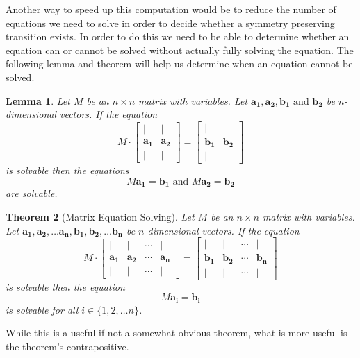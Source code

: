 \documentclass[a4paper,10pt]{article}
\theoremstyle{plain}
\newtheorem{Theorem}{Theorem}
\newtheorem{Lemma}[Theorem]{Lemma}
\theoremstyle{definition}
\theoremstyle{remark}
\renewcommand{\vec}[1]{\mathbf{#1}}
\begin{document}
Another way to speed up this computation would be to reduce the number of equations we need to solve in order to decide whether a symmetry preserving transition exists.
In order to do this we need to be able to determine whether an equation can or cannot be solved without actually fully solving the equation.
The following lemma and theorem will help us determine when an equation cannot be solved.
\begin{Lemma}
	Let \( M \) be an \( n \times n \) matrix with variables.
	Let \( \vec{a_1}, \vec{a_2}, \vec{b_1} \text{ and } \vec{b_2} \) be \( n \)-dimensional vectors.
	If the equation \[
	M
	\cdot
	\begin{bmatrix}
		| & | \\
		\vec{a_1} & \vec{a_2} \\
		| & |
	\end{bmatrix}
	=
	\begin{bmatrix}
		| & | \\
		\vec{b_1} & \vec{b_2} \\
		| & |
	\end{bmatrix}
	\]
	is solvable then the equations \[M\vec{a_1} = \vec{b_1} \text{ and } M\vec{a_2} = \vec{b_2}\] are solvable.
\end{Lemma}
\begin{Theorem}[Matrix Equation Solving]
	Let \( M \) be an \( n \times n \) matrix with variables.
	Let \( \vec{a_1}, \vec{a_2}, \dots \vec{a_n}, \vec{b_1}, \vec{b_2}, \dots \vec{b_n} \) be \( n \)-dimensional vectors.
	If the equation \[
	M
	\cdot
	\begin{bmatrix}
		| & | & \cdots & |\\
		\vec{a_1} & \vec{a_2} & \cdots & \vec{a_n} \\
		| & | & \cdots & |
	\end{bmatrix}
	=
	\begin{bmatrix}
		| & | & \cdots & |\\
		\vec{b_1} & \vec{b_2} & \cdots & \vec{b_n} \\
		| & | & \cdots & |
	\end{bmatrix}
	\]
	is solvable then the equation \[M\vec{a_i} = \vec{b_i}\] is solvable for all \( i \in \{1, 2, \dots n\} \).
	\label{thrm:matrix-equation-solving}
\end{Theorem}
\noindent While this is a useful if not a somewhat obvious theorem, what is more useful is the theorem's contrapositive.
\end{document}
